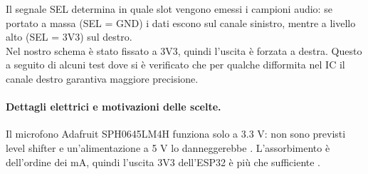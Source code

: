   
  \begin{table}[H]
    \centering
    \label{tab:i2s_pins}
    \caption{Mappatura hardware dei pin I$^2$S tra ESP32 e microfono SPH0645LM4H.}
  
  \end{table}
  
  \noindent
  Il segnale SEL determina in quale slot vengono emessi i campioni audio: se portato a massa (SEL = GND) i dati escono sul canale sinistro,
  mentre a livello alto (SEL = 3V3) sul destro. \\
  Nel nostro schema è stato fissato a 3V3, quindi l’uscita è forzata a destra.
  Questo a seguito di alcuni test dove si è verificato che per qualche difformita nel IC il canale destro garantiva maggiore precisione.\\
  
  \paragraph{Dettagli elettrici e motivazioni delle scelte.}
  Il microfono Adafruit SPH0645LM4H funziona solo a 3.3 V: non sono previsti level shifter e un’alimentazione a 5 V lo danneggerebbe \citep{digikey-sheet}. L’assorbimento è dell’ordine dei mA, quindi l’uscita 3V3 dell’ESP32 è più che sufficiente \citep{digikey-sheet}.
    
